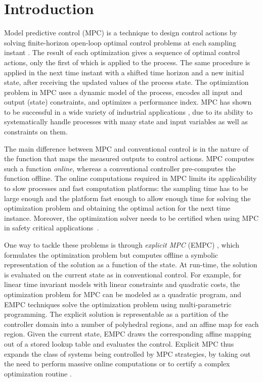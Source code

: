 \section{Introduction}

Model predictive control (MPC) is a technique to design control actions by solving finite-horizon open-loop
optimal control problems at each sampling instant \cite{RMD17}.
The result of each optimization gives a sequence of optimal control actions, only the first of which is applied
to the process.
The same procedure is applied in the next time instant with a shifted time horizon and a new initial state, 
after receiving the updated values of the process state.
The optimization problem in MPC uses a dynamic model of the process, encodes all input and output (state) constraints, and 
optimizes a performance index. 
MPC has shown to be successful in a wide variety of industrial applications \cite{QinBadgwell03}, due to its 
ability to systematically handle processes with many state and input variables as well as constraints on them. 

The main difference between MPC and conventional control is in the nature of the function that maps the measured outputs to control actions. 
MPC computes such a function \emph{online}, whereas a conventional controller pre-computes the function offline.
The online computations required in MPC limits its applicability to slow processes and fast computation platforms: 
the sampling time has to be large enough and the platform fast enough to allow enough time for solving the optimization problem
and obtaining the optimal action for the next time instance. 
Moreover, the optimization solver needs to be certified when using MPC in safety critical applications~\cite{Alessio2009}.

One way to tackle these problems is through \emph{explicit MPC} (EMPC) \cite{Bemporad:2002,Alessio2009}, which formulates the optimization
problem but computes offline a symbolic representation of the solution as a function of the state.
At run-time, the solution is evaluated on the current state as in conventional control.
For example, for linear time invariant models with linear constraints and quadratic costs, the optimization
problem for MPC can be modeled as a quadratic program, and EMPC techniques solve the optimization problem
using multi-parametric programming.
The explicit solution is representable as a partition of the controller domain into a number of polyhedral regions,
and an affine map for each region. 
Given the current state, EMPC draws the corresponding affine mapping out of a stored lookup table and evaluates the control.
Explicit MPC thus expands the class of systems being controlled by MPC strategies, by taking out the need to perform massive online computations
or to certify a complex optimization routine \cite{memoryMPC}.

